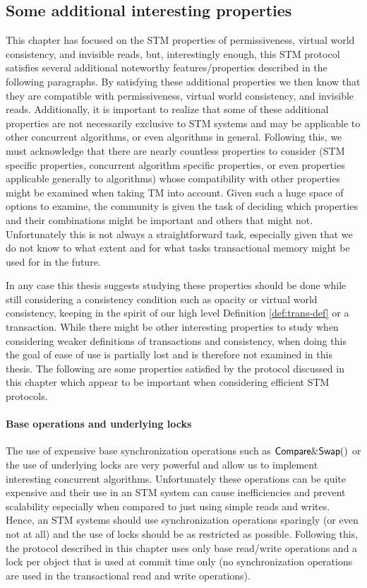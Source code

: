 \subsection{Some additional interesting properties}

This chapter has focused on the STM properties of permissiveness, virtual world consistency,
and invisible reads, but,
interestingly enough, this  STM protocol  satisfies several additional  noteworthy
features/properties described in the following paragraphs. 
By satisfying these additional properties we then know that they are compatible
with permissiveness, virtual world consistency, and invisible reads.
Additionally, it is important to realize that some of these additional properties are not necessarily
exclusive to STM systems and may be applicable to other concurrent algorithms,
or even algorithms in general.
Following this, we must acknowledge that there are nearly countless properties
to consider (STM specific properties, concurrent algorithm specific properties, or even properties applicable
generally to algorithms) whose
compatibility with other properties might be examined when taking TM into account.
Given such a huge space of options to examine, the community
is given the task of deciding which properties and their combinations might be important and
others that might not.
Unfortunately this is not always a straightforward task, especially given
that we do not know to what extent and for what tasks transactional memory
might be used for in the future.

In any case this thesis suggests studying these properties should be done while still considering
a consistency condition such as opacity
or virtual world consistency, keeping in the spirit of our high level Definition \ref{def:trans-def}
or a transaction.
While there might be other interesting properties to study when considering
weaker definitions of transactions and consistency, when doing this the goal of ease of use
is partially lost and is therefore not examined in this thesis.
The following are some properties satisfied by the protocol discussed in this chapter which appear
to be important when considering efficient STM protocols.

\paragraph{Base operations and underlying locks}
The use of expensive  base synchronization operations such as 
${\sf Compare\&Swap()}$  or  the use of underlying locks are very
powerful and allow us to implement interesting concurrent algorithms.
Unfortunately these operations can be quite expensive and their use in
an STM system can cause inefficiencies  and prevent scalability
especially when compared to just using simple reads and writes.
Hence, an STM systems should use  synchronization operations 
sparingly  (or even not at all) and the use of locks should be  as
restricted as  possible. 
Following this, the protocol described in this chapter uses only base read/write operations and a lock per object 
that is  used   at  commit  time   only (no synchronization operations
are used in the transactional read and write operations).



